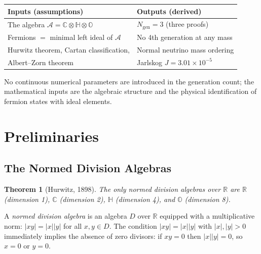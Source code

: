 \documentclass[12pt,a4paper]{article}
\newtheorem{theorem}{Theorem}
\theoremstyle{definition}
\theoremstyle{remark}
\newcommand{\Oct}{\mathbb{O}}
\newcommand{\Quat}{\mathbb{H}}
\newcommand{\Comp}{\mathbb{C}}
\newcommand{\Real}{\mathbb{R}}
\newcommand{\Alg}{\mathcal{A}}
\begin{document}
\begin{center}
\begin{tabular}{ll}
\hline
\textbf{Inputs (assumptions)} & \textbf{Outputs (derived)} \\
\hline
The algebra $\Alg = \Comp\otimes\Quat\otimes\Oct$ & $N_{\mathrm{gen}} = 3$ (three proofs) \\
Fermions $=$ minimal left ideal of $\Alg$ & No 4th generation at any mass \\
Hurwitz theorem, Cartan classification, & Normal neutrino mass ordering \\
\quad Albert--Zorn theorem & Jarlskog $J = 3.01\times 10^{-5}$ \\
\hline
\end{tabular}
\end{center}
\noindent No continuous numerical parameters are introduced in the generation 
count; the mathematical inputs are the algebraic structure and the physical 
identification of fermion states with ideal elements.

\section{Preliminaries}
\label{sec:prelim}

\subsection{The Normed Division Algebras}

\begin{theorem}[Hurwitz, 1898]
The only normed division algebras over $\Real$ are $\Real$ (dimension 1), 
$\Comp$ (dimension 2), $\Quat$ (dimension 4), and $\Oct$ (dimension 8).
\end{theorem}

A \emph{normed division algebra} is an algebra $D$ over $\Real$ equipped with a 
multiplicative norm: $|xy| = |x||y|$ for all $x, y \in D$. The condition 
$|xy| = |x||y|$ with $|x|, |y| > 0$ immediately implies the absence of zero 
divisors: if $xy = 0$ then $|x||y| = 0$, so $x = 0$ or $y = 0$.
\end{document}
